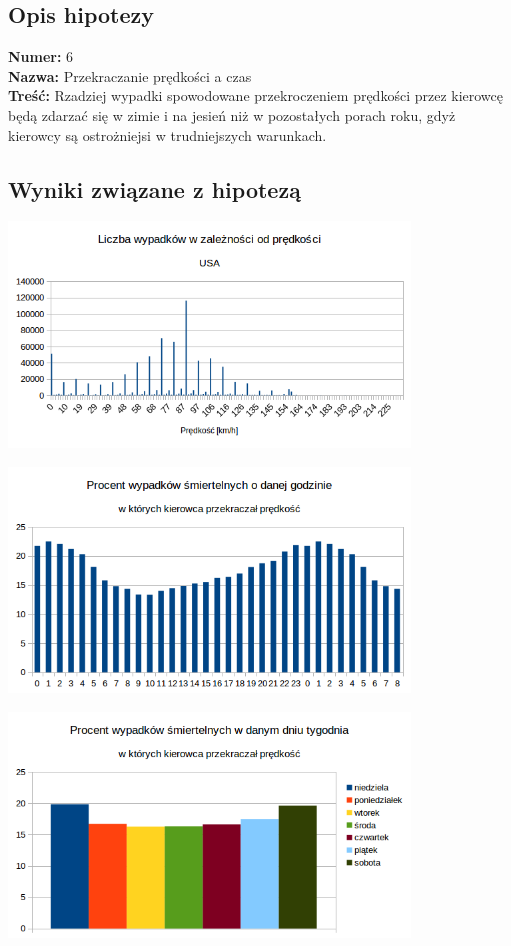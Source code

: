 \subsection{Opis hipotezy}\label{opis-hipotezy}

\textbf{Numer:} 6\\\textbf{Nazwa:} Przekraczanie prędkości a
czas\\\textbf{Treść:} Rzadziej wypadki spowodowane przekroczeniem
prędkości przez kierowcę będą zdarzać się w zimie i na jesień niż w
pozostałych porach roku, gdyż kierowcy są ostrożniejsi w trudniejszych
warunkach.

\subsection{Wyniki związane z
hipotezą}\label{wyniki-zwiazane-z-hipoteza}

\centerline{\includegraphics[width=0.8\textwidth]{images/hipotheses/speed/speed.png}}

\centerline{\includegraphics[width=0.8\textwidth]{images/hipotheses/speed/speed_exceeded_by_hour.png}}

\centerline{\includegraphics[width=0.8\textwidth]{images/hipotheses/speed/speed_exceeded_by_day_of_week.png}}

